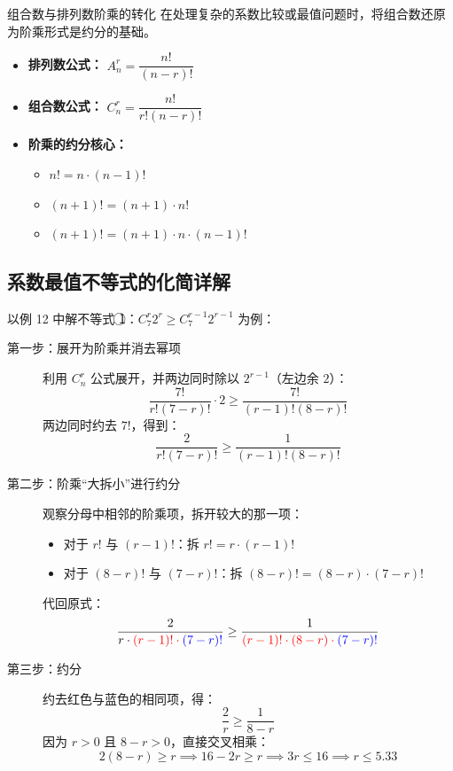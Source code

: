 \documentclass[11pt,a4paper]{article}
\newlength{\myspace}             %
\begin{document}
\begin{mybox}{组合数与排列数阶乘的转化}
在处理复杂的系数比较或最值问题时，将组合数还原为阶乘形式是约分的基础。

\begin{itemize}
    \item \textbf{排列数公式：} $A_n^r = \dfrac{n!}{(n-r)!}$
    \item \textbf{组合数公式：} $C_n^r = \dfrac{n!}{r!(n-r)!}$
    \item \textbf{阶乘的约分核心：} 
    \begin{itemize}[label=]
        \item $n! = n \cdot (n-1)!$
        \item $(n+1)! = (n+1) \cdot n!$
        \item $(n+1)! = (n+1) \cdot n \cdot (n-1)!$
    \end{itemize}
\end{itemize}

\end{mybox}

\vspace{\myspace}

\subsection{系数最值不等式的化简详解}

以例 12 中解不等式 \textcircled{1}：$C_7^r 2^r \geq C_7^{r-1} 2^{r-1}$ 为例：

\begin{description}
    \item[第一步：展开为阶乘并消去幂项]
    利用 $C_n^r$ 公式展开，并两边同时除以 $2^{r-1}$（左边余 $2$）：
    \[ \frac{7!}{r!(7-r)!} \cdot 2 \geq \frac{7!}{(r-1)!(8-r)!} \]
    两边同时约去 $7!$，得到：
    \[ \frac{2}{r!(7-r)!} \geq \frac{1}{(r-1)!(8-r)!} \]

    \item[第二步：阶乘“大拆小”进行约分]
    观察分母中相邻的阶乘项，拆开较大的那一项：
    \begin{itemize}
        \item 对于 $r!$ 与 $(r-1)!$：拆 $r! = r \cdot (r-1)!$
        \item 对于 $(8-r)!$ 与 $(7-r)!$：拆 $(8-r)! = (8-r) \cdot (7-r)!$
    \end{itemize}
    代回原式：
    \[ \frac{2}{r \cdot \color{red}{(r-1)!} \cdot \color{blue}{(7-r)!}} \geq \frac{1}{\color{red}{(r-1)!} \cdot (8-r) \cdot \color{blue}{(7-r)!}} \]

    \item[第三步：约分]
    约去红色与蓝色的相同项，得：
    \[ \frac{2}{r} \geq \frac{1}{8-r} \]
    因为 $r > 0$ 且 $8-r > 0$，直接交叉相乘：
    \[ 2(8-r) \geq r \implies 16-2r \geq r \implies 3r \leq 16 \implies r \leq 5.33 \]
\end{description}
\end{document}
